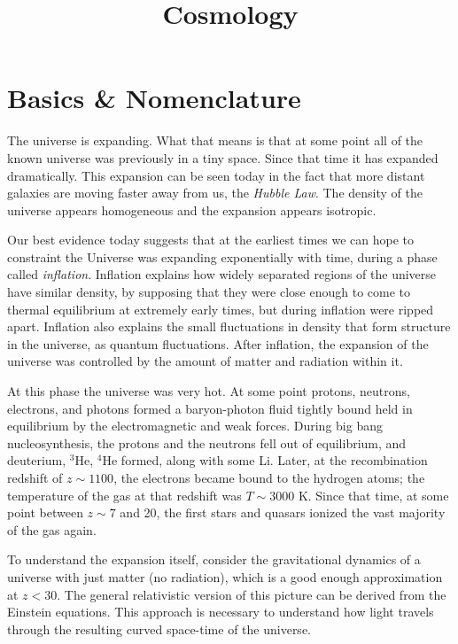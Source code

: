 \title{\bf Cosmology}

\section{Basics \& Nomenclature}

The universe is expanding. What that means is that at some point all
of the known universe was previously in a tiny space. Since that time
it has expanded dramatically. This expansion can be seen today in the
fact that more distant galaxies are moving faster away from us, the
{\it Hubble Law}. The density of the universe appears homogeneous and
the expansion appears isotropic.

Our best evidence today suggests that at the earliest times we can
hope to constraint the Universe was expanding exponentially with time,
during a phase called {\it inflation}. Inflation explains how widely
separated regions of the universe have similar density, by supposing
that they were close enough to come to thermal equilibrium at
extremely early times, but during inflation were ripped apart.
Inflation also explains the small fluctuations in density that form
structure in the universe, as quantum fluctuations. After inflation,
the expansion of the universe was controlled by the amount of matter
and radiation within it.

At this phase the universe was very hot. At some point protons,
neutrons, electrons, and photons formed a baryon-photon fluid tightly
bound held in equilibrium by the electromagnetic and weak
forces. During big bang nucleosynthesis, the protons and the neutrons
fell out of equilibrium, and deuterium, ${}^3$He, ${}^4$He formed,
along with some Li. Later, at the recombination redshift of $z\sim
1100$, the electrons became bound to the hydrogen atoms; the
temperature of the gas at that redshift was $T\sim 3000$ K. Since that
time, at some point between $z\sim 7$ and 20, the first stars and
quasars ionized the vast majority of the gas again.

To understand the expansion itself, consider the gravitational
dynamics of a universe with just matter (no radiation), which is a
good enough approximation at $z<30$. The general relativistic version
of this picture can be derived from the Einstein equations. This
approach is necessary to understand how light travels through the
resulting curved space-time of the universe.

